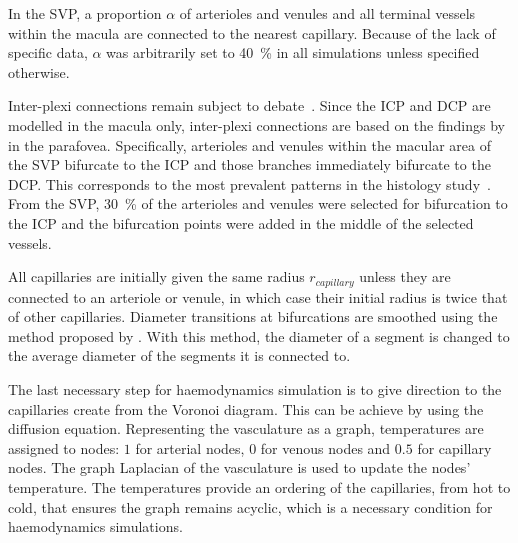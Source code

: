 \documentclass[11pt,]{article}
\begin{document}
In the SVP, a proportion $\alpha$ of arterioles and venules and all terminal vessels within the macula are connected to the nearest capillary. Because of the lack of specific data, $\alpha$ was arbitrarily set to \SI{40}{\percent} in all simulations unless specified otherwise.

Inter-plexi connections remain subject to debate~\cite{An2020,Chiaravalli2022,Campbell2017}.
Since the ICP and DCP are modelled in the macula only, inter-plexi connections are based on the findings by \citet{An2020} in the parafovea.
Specifically, arterioles and venules within the macular area of the SVP bifurcate to the ICP and those branches immediately bifurcate to the DCP.
This corresponds to the most prevalent patterns in the histology study~\cite{An2020}.
From the SVP, \SI{30}{\percent} of the arterioles and venules were selected for bifurcation to the ICP and the bifurcation points were added in the middle of the selected vessels.

All capillaries are initially given the same radius $r_{capillary}$ unless they are connected to an arteriole or venule, in which case their initial radius is twice that of other capillaries.
Diameter transitions at bifurcations are smoothed using the method proposed by \citet{Linninger2013}.
With this method, the diameter of a segment is changed to the average diameter of the segments it is connected to.

The last necessary step for haemodynamics simulation is to give direction to the capillaries create from the Voronoi diagram.
This can be achieve by using the diffusion equation.
Representing the vasculature as a graph, temperatures are assigned to nodes: $1$ for arterial nodes, $0$ for venous nodes and $0.5$ for capillary nodes.
The graph Laplacian of the vasculature is used to update the nodes' temperature.
The temperatures provide an ordering of the capillaries, from hot to cold, that ensures the graph remains acyclic, which is a necessary condition for haemodynamics simulations.
\end{document}
